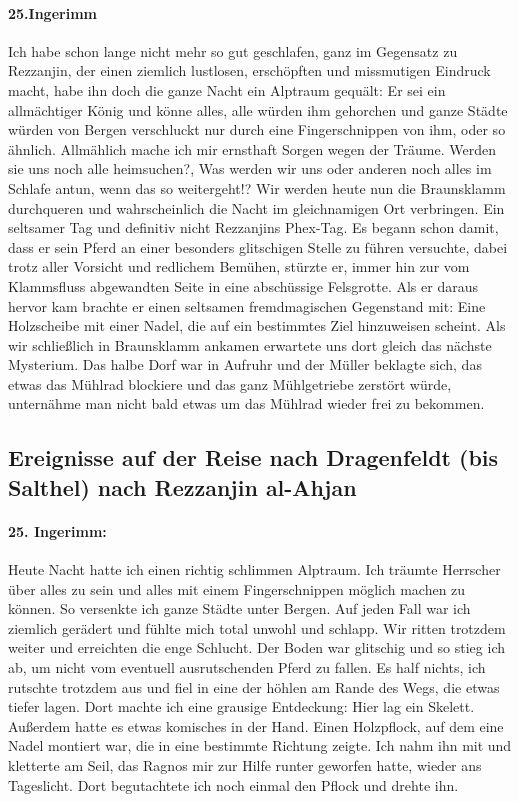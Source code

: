 \documentclass[11pt]{scrreprt}
\begin{document}
\paragraph{25.Ingerimm}

Ich habe schon lange nicht mehr so gut geschlafen, ganz im Gegensatz zu Rezzanjin, der einen ziemlich lustlosen, erschöpften und missmutigen Eindruck macht, habe ihn doch die ganze Nacht ein Alptraum gequält: Er sei ein allmächtiger König und könne alles, alle würden ihm gehorchen und ganze Städte würden von Bergen verschluckt nur durch eine Fingerschnippen von ihm, oder so ähnlich. Allmählich mache ich mir ernsthaft Sorgen wegen der Träume. Werden sie uns noch alle heimsuchen?, Was werden wir uns oder anderen noch alles im Schlafe antun, wenn das so weitergeht!? Wir werden heute nun die Braunsklamm durchqueren und wahrscheinlich die Nacht im gleichnamigen Ort verbringen.
Ein seltsamer Tag und definitiv nicht Rezzanjins Phex-Tag. Es begann schon damit, dass er sein Pferd an einer besonders glitschigen Stelle zu führen versuchte, dabei trotz aller Vorsicht und redlichem Bemühen, stürzte er, immer hin zur vom Klammsfluss abgewandten Seite in eine abschüssige Felsgrotte. Als er daraus hervor kam brachte er einen seltsamen fremdmagischen Gegenstand mit: Eine Holzscheibe mit einer Nadel, die auf ein bestimmtes Ziel hinzuweisen scheint. Als wir schließlich in Braunsklamm ankamen erwartete uns dort gleich das nächste Mysterium. Das halbe Dorf war in Aufruhr und der Müller beklagte sich, das etwas das Mühlrad blockiere und das ganz Mühlgetriebe zerstört würde, unternähme man nicht bald etwas um das Mühlrad wieder frei zu bekommen.

\subsection{Ereignisse auf der Reise nach Dragenfeldt (bis Salthel) nach Rezzanjin al-Ahjan}

\paragraph{25. Ingerimm:}
Heute Nacht hatte ich einen richtig schlimmen Alptraum. Ich träumte Herrscher über alles zu sein und alles mit einem Fingerschnippen möglich machen zu können. So versenkte ich ganze Städte unter Bergen. Auf jeden Fall war ich ziemlich gerädert und fühlte mich total unwohl und schlapp. Wir ritten trotzdem weiter und erreichten die enge Schlucht. Der Boden war glitschig und so stieg ich ab, um nicht vom eventuell ausrutschenden Pferd zu fallen. Es half nichts, ich rutschte trotzdem aus und fiel in eine der höhlen am Rande des Wegs, die etwas tiefer lagen. Dort machte ich eine grausige Entdeckung: Hier lag ein Skelett. Außerdem hatte es etwas komisches in der Hand. Einen Holzpflock, auf dem eine Nadel montiert war, die in eine bestimmte Richtung zeigte. Ich nahm ihn mit und kletterte am Seil, das Ragnos mir zur Hilfe runter geworfen hatte, wieder ans Tageslicht. Dort begutachtete ich noch einmal den Pflock und drehte ihn.\par
\end{document}
